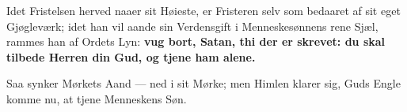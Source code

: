 \documentclass[12pt,a4paper]{book}
\begin{document}
Idet Fristelsen herved naaer sit Høieste, er Fristeren selv som bedaaret af sit eget
Gjøgleværk; idet han vil aande sin Verdensgift i Menneskesønnens rene Sjæl, rammes han
af Ordets Lyn: \textbf{vug bort, Satan, thi der er skrevet: du skal tilbede Herren din
Gud, og tjene ham alene.}

Saa synker Mørkets Aand --- ned i sit Mørke; men Himlen klarer sig, Guds Engle komme
nu, at tjene Menneskens Søn.
\end{document}

